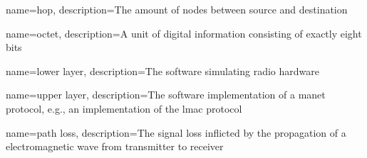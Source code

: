 {
    name={hop},
    description={The amount of nodes between source and destination}
}

{
    name={octet},
    description={A unit of digital information consisting of exactly eight bits}
}

{
    name={lower layer},
    description={The software simulating radio hardware}
}

{
    name={upper layer},
    description={The software implementation of a \acrshort{manet} protocol, e.g., an implementation of the \acrshort{lmac} protocol}
}

{
    name={path loss},
    description={The signal loss inflicted by the propagation of a electromagnetic wave from transmitter to receiver~\cite[p.~10]{paper:linkmodel}}
}